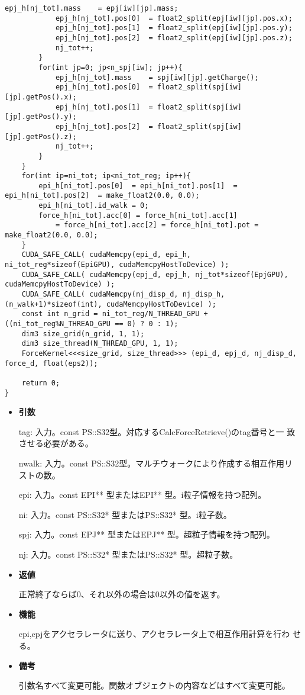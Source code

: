 \begin{lstlisting}[caption=calcForceDispatch]
            epj_h[nj_tot].mass    = epj[iw][jp].mass;
            epj_h[nj_tot].pos[0]  = float2_split(epj[iw][jp].pos.x);
            epj_h[nj_tot].pos[1]  = float2_split(epj[iw][jp].pos.y);
            epj_h[nj_tot].pos[2]  = float2_split(epj[iw][jp].pos.z);
            nj_tot++;
        }
        for(int jp=0; jp<n_spj[iw]; jp++){
            epj_h[nj_tot].mass    = spj[iw][jp].getCharge();
            epj_h[nj_tot].pos[0]  = float2_split(spj[iw][jp].getPos().x);
            epj_h[nj_tot].pos[1]  = float2_split(spj[iw][jp].getPos().y);
            epj_h[nj_tot].pos[2]  = float2_split(spj[iw][jp].getPos().z);
            nj_tot++;
        }
    }
    for(int ip=ni_tot; ip<ni_tot_reg; ip++){
        epi_h[ni_tot].pos[0]  = epi_h[ni_tot].pos[1]  = epi_h[ni_tot].pos[2]  = make_float2(0.0, 0.0);
        epi_h[ni_tot].id_walk = 0;
        force_h[ni_tot].acc[0] = force_h[ni_tot].acc[1] 
            = force_h[ni_tot].acc[2] = force_h[ni_tot].pot = make_float2(0.0, 0.0);
    }
    CUDA_SAFE_CALL( cudaMemcpy(epi_d, epi_h, ni_tot_reg*sizeof(EpiGPU), cudaMemcpyHostToDevice) );
    CUDA_SAFE_CALL( cudaMemcpy(epj_d, epj_h, nj_tot*sizeof(EpjGPU), cudaMemcpyHostToDevice) );
    CUDA_SAFE_CALL( cudaMemcpy(nj_disp_d, nj_disp_h, (n_walk+1)*sizeof(int), cudaMemcpyHostToDevice) );
    const int n_grid = ni_tot_reg/N_THREAD_GPU + ((ni_tot_reg%N_THREAD_GPU == 0) ? 0 : 1);
    dim3 size_grid(n_grid, 1, 1);
    dim3 size_thread(N_THREAD_GPU, 1, 1);
    ForceKernel<<<size_grid, size_thread>>> (epi_d, epj_d, nj_disp_d, force_d, float(eps2));

    return 0;
}
\end{lstlisting}

\begin{itemize}

\item {\bf 引数}

  tag: 入力。const PS::S32型。対応するCalcForceRetrieve()のtag番号と一
  致させる必要がある。
  
  nwalk: 入力。const PS::S32型。マルチウォークにより作成する相互作用リ
  ストの数。
  
  epi: 入力。const EPI** 型またはEPI** 型。i粒子情報を持つ配列。

  ni: 入力。const PS::S32* 型またはPS::S32* 型。i粒子数。

  spj: 入力。const EPJ** 型またはEPJ** 型。超粒子情報を持つ配列。
  
  nj: 入力。const PS::S32* 型またはPS::S32* 型。超粒子数。

\item {\bf 返値}

  正常終了ならば0、それ以外の場合は0以外の値を返す。
  
\item {\bf 機能}

  epi,epjをアクセラレータに送り、アクセラレータ上で相互作用計算を行わ
  せる。
  
\item {\bf 備考}

  引数名すべて変更可能。関数オブジェクトの内容などはすべて変更可能。
  
\end{itemize}

